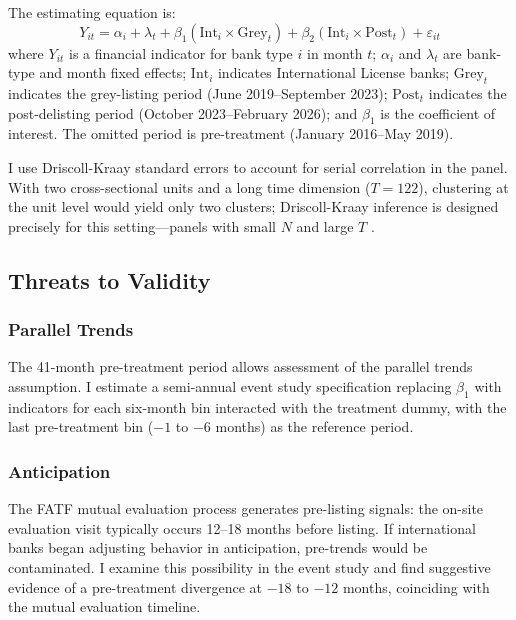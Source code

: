 \documentclass[12pt]{article}
\begin{document}
The estimating equation is:
\begin{equation}
Y_{it} = \alpha_i + \lambda_t + \beta_1 (\text{Int}_i \times \text{Grey}_t) + \beta_2 (\text{Int}_i \times \text{Post}_t) + \varepsilon_{it}
\label{eq:did}
\end{equation}
where $Y_{it}$ is a financial indicator for bank type $i$ in month $t$; $\alpha_i$ and $\lambda_t$ are bank-type and month fixed effects; $\text{Int}_i$ indicates International License banks; $\text{Grey}_t$ indicates the grey-listing period (June 2019--September 2023); $\text{Post}_t$ indicates the post-delisting period (October 2023--February 2026); and $\beta_1$ is the coefficient of interest. The omitted period is pre-treatment (January 2016--May 2019).

I use Driscoll-Kraay standard errors to account for serial correlation in the panel. With two cross-sectional units and a long time dimension ($T = 122$), clustering at the unit level would yield only two clusters; Driscoll-Kraay inference is designed precisely for this setting---panels with small $N$ and large $T$ \citep{driscoll1998}.

\subsection{Threats to Validity}

\subsubsection*{Parallel Trends}
The 41-month pre-treatment period allows assessment of the parallel trends assumption. I estimate a semi-annual event study specification replacing $\beta_1$ with indicators for each six-month bin interacted with the treatment dummy, with the last pre-treatment bin ($-1$ to $-6$ months) as the reference period.

\subsubsection*{Anticipation}
The FATF mutual evaluation process generates pre-listing signals: the on-site evaluation visit typically occurs 12--18 months before listing. If international banks began adjusting behavior in anticipation, pre-trends would be contaminated. I examine this possibility in the event study and find suggestive evidence of a pre-treatment divergence at $-18$ to $-12$ months, coinciding with the mutual evaluation timeline.
\end{document}
